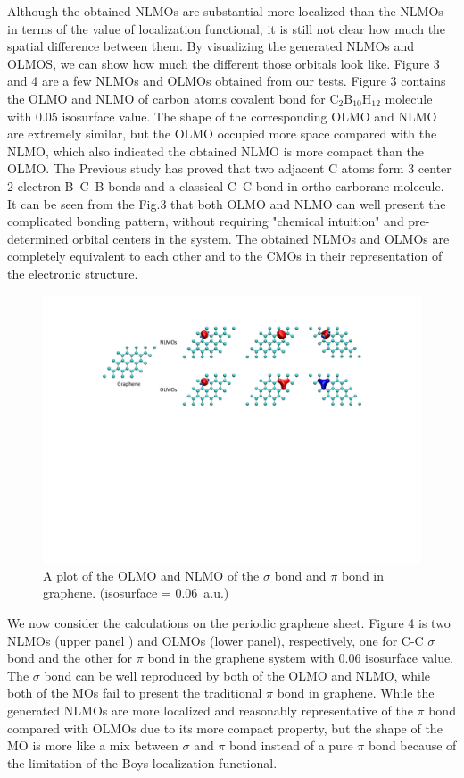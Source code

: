 \documentclass[aps,prl,reprint,amsmath,amssymb]{revtex4-1}
\begin{document}
Although the obtained NLMOs are substantial more localized than the NLMOs in terms of the value of localization functional, it is still not clear how much the spatial difference between them.
By visualizing the generated NLMOs and OLMOS, we can show how much the different those orbitals look like.
Figure 3 and 4 are a few NLMOs and OLMOs obtained from our tests.
Figure 3 contains the OLMO and NLMO of carbon atoms covalent bond for C$_2$B$_{10}$H$_{12}$ molecule with 0.05 isosurface value.
The shape of the corresponding OLMO and NLMO are extremely similar, but the OLMO occupied more space compared with the NLMO, which also indicated the obtained NLMO is more compact than the OLMO.
The Previous study has proved that two adjacent C atoms form 3 center 2 electron B–C–B bonds and a classical C–C bond in ortho-carborane molecule.\cite{melichar2018systematic}
It can be seen from the Fig.3 that both OLMO and NLMO can well present the complicated bonding pattern, without requiring "chemical intuition" and pre-determined orbital centers in the system.
The obtained NLMOs and OLMOs  are completely equivalent to each other and to the CMOs in their representation of the electronic structure.

\begin{figure}[hbpt]
\centering
\includegraphics[width=\textwidth]{figure_4.pdf}
\caption{A plot of the OLMO and NLMO of the $\sigma$ bond and $\pi$ bond in graphene. (isosurface = 0.06~a.u.)}
\end{figure}

We now consider the calculations on the periodic graphene sheet.
Figure 4 is two NLMOs (upper panel ) and OLMOs (lower panel), respectively, one for C-C $\sigma$ bond and the other for $\pi$ bond in the graphene system with 0.06 isosurface value.
The $\sigma$ bond can be well reproduced by both of the OLMO and NLMO, while both of the MOs fail to present the traditional $\pi$ bond in graphene.
While the generated NLMOs are more localized and reasonably representative of the $\pi$ bond compared with OLMOs due to its more compact property, but the shape of the MO is more like a mix between $\sigma$ and $\pi$ bond instead of a pure $\pi$ bond because of the limitation of the Boys localization functional.
\end{document}
